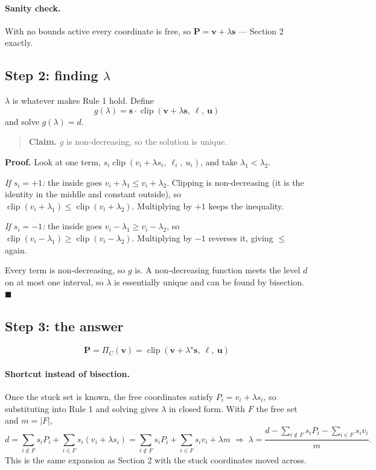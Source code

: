 \documentclass[11pt]{article}
\begin{document}
\paragraph{Sanity check.} With no bounds active every coordinate is free, so
$\mathbf{P}=\mathbf{v}+\lambda\mathbf{s}$ --- Section 2 exactly.

\subsection*{Step 2: finding $\lambda$}

$\lambda$ is whatever makes Rule 1 hold. Define
\[
g(\lambda) = \mathbf{s}\cdot\operatorname{clip}(\mathbf{v}+\lambda\mathbf{s},\ \bm{\ell},\ \mathbf{u})
\]
and solve $g(\lambda)=d$.

\begin{quote}
\textbf{Claim.} $g$ is non-decreasing, so the solution is unique.
\end{quote}

\noindent\textbf{Proof.} Look at one term,
$s_i\operatorname{clip}(v_i+\lambda s_i,\ \ell_i,\ u_i)$, and take $\lambda_1<\lambda_2$.

\emph{If $s_i=+1$:} the inside goes $v_i+\lambda_1 \le v_i+\lambda_2$. Clipping is
non-decreasing (it is the identity in the middle and constant outside), so
$\operatorname{clip}(v_i+\lambda_1)\le\operatorname{clip}(v_i+\lambda_2)$.
Multiplying by $+1$ keeps the inequality.

\emph{If $s_i=-1$:} the inside goes $v_i-\lambda_1 \ge v_i-\lambda_2$, so
$\operatorname{clip}(v_i-\lambda_1)\ge\operatorname{clip}(v_i-\lambda_2)$.
Multiplying by $-1$ reverses it, giving $\le$ again.

Every term is non-decreasing, so $g$ is. A non-decreasing function meets the level
$d$ on at most one interval, so $\lambda$ is essentially unique and can be found by
bisection. \hfill$\blacksquare$

\subsection*{Step 3: the answer}
\[
\boxed{\;\mathbf{P} = \Pi_C(\mathbf{v}) = \operatorname{clip}(\mathbf{v}+\lambda^\star\mathbf{s},\ \bm{\ell},\ \mathbf{u})\;}
\]

\paragraph{Shortcut instead of bisection.} Once the stuck set is known, the free
coordinates satisfy $P_i=v_i+\lambda s_i$, so substituting into Rule 1 and solving
gives $\lambda$ in closed form. With $F$ the free set and $m=|F|$,
\[
d = \sum_{i\notin F} s_iP_i + \sum_{i\in F} s_i(v_i+\lambda s_i)
  = \sum_{i\notin F} s_iP_i + \sum_{i\in F} s_iv_i + \lambda m
\;\Longrightarrow\;
\lambda = \frac{d-\sum_{i\notin F}s_iP_i-\sum_{i\in F}s_iv_i}{m}.
\]
This is the same expansion as Section 2 with the stuck coordinates moved across.
\end{document}
